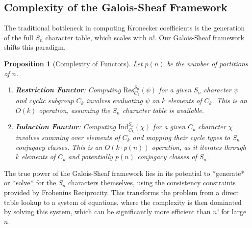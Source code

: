 \documentclass[11pt]{article}
\newtheorem{proposition}[theorem]{Proposition}
\theoremstyle{definition}
\theoremstyle{remark}
\begin{document}
\subsection{Complexity of the Galois-Sheaf Framework}
The traditional bottleneck in computing Kronecker coefficients is the generation of the full $S_n$ character table, which scales with $n!$. Our Galois-Sheaf framework shifts this paradigm.
\begin{proposition}[Complexity of Functors]
Let $p(n)$ be the number of partitions of $n$.
\begin{enumerate}
    \item \textbf{Restriction Functor}: Computing $\text{Res}^{S_n}_{C_k}(\psi)$ for a given $S_n$ character $\psi$ and cyclic subgroup $C_k$ involves evaluating $\psi$ on $k$ elements of $C_k$. This is an $O(k)$ operation, assuming the $S_n$ character table is available.
    \item \textbf{Induction Functor}: Computing $\text{Ind}^{S_n}_{C_k}(\chi)$ for a given $C_k$ character $\chi$ involves summing over elements of $C_k$ and mapping their cycle types to $S_n$ conjugacy classes. This is an $O(k \cdot p(n))$ operation, as it iterates through $k$ elements of $C_k$ and potentially $p(n)$ conjugacy classes of $S_n$.
\end{enumerate}
\end{proposition}
The true power of the Galois-Sheaf framework lies in its potential to *generate* or *solve* for the $S_n$ characters themselves, using the consistency constraints provided by Frobenius Reciprocity. This transforms the problem from a direct table lookup to a system of equations, where the complexity is then dominated by solving this system, which can be significantly more efficient than $n!$ for large $n$.
\end{document}
